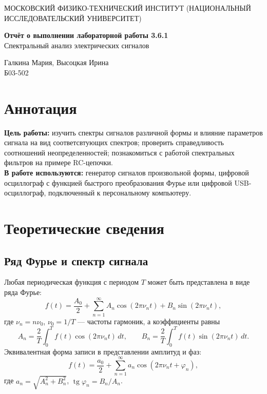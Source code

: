\documentclass[a4paper,10pt]{article}
\begin{document}
\begin{center}
    {\large МОСКОВСКИЙ ФИЗИКО-ТЕХНИЧЕСКИЙ ИНСТИТУТ (НАЦИОНАЛЬНЫЙ ИССЛЕДОВАТЕЛЬСКИЙ УНИВЕРСИТЕТ)}
\end{center}

\vspace{4.5cm}
{\Large
\begin{center}
\end{center}
{\bf Отчёт о выполнении лабораторной работы 3.6.1}\\
Спектральный анализ электрических сигналов
}
\vspace{2cm}
\begin{flushright}
    {\normalsize Галкина Мария, Высоцкая Ирина \\
    \vspace{0.2cm}
    Б03-502}
\end{flushright}
\vspace{8cm}


\section{Аннотация}
\noindent \textbf{Цель работы:} изучить спектры сигналов различной формы и влияние параметров сигнала на вид соответсвтующих спектров; проверить справедливость соотношений неопределенностей; познакомиться с работой спектральных фильтров на примере RC-цепочки.\\
\textbf{В работе используются:} 
генератор сигналов произвольной формы, цифровой осциллограф с функцией быстрого преобразования Фурье или цифровой USB-осциллограф, подключенный к персональному компьютеру.

\section{Теоретические сведения}


\subsection*{Ряд Фурье и спектр сигнала}

Любая периодическая функция с периодом $T$ может быть представлена в виде ряда Фурье:
\begin{equation}
f(t) = \frac{A_0}{2} + \sum_{n=1}^{\infty} A_n \cos(2\pi\nu_n t) + B_n \sin(2\pi\nu_n t),
\end{equation}
где $\nu_n = n\nu_0$, $\nu_0 = 1/T$ --- частоты гармоник, а коэффициенты равны
\begin{equation}
A_n = \frac{2}{T}\int_0^T f(t)\cos(2\pi\nu_n t)\,dt, \qquad
B_n = \frac{2}{T}\int_0^T f(t)\sin(2\pi\nu_n t)\,dt.
\end{equation}
Эквивалентная форма записи в представлении амплитуд и фаз:
\begin{equation}
f(t) = \frac{a_0}{2} + \sum_{n=1}^{\infty} a_n \cos(2\pi\nu_n t + \varphi_n),
\end{equation}
где $a_n = \sqrt{A_n^2 + B_n^2}$, $\operatorname{tg}\varphi_n = B_n/A_n$.
\end{document}
